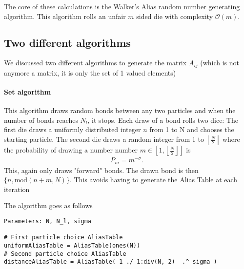 \documentclass[a4paper]{article}
\begin{document}
The core of these calculations is the Walker's Alias random number generating algorithm. This algorithm rolls an unfair $m$ sided die with complexity $\mathcal{O}(m)$.

\subsection{Two different algorithms}

We discussed two different algorithms to generate the matrix $A_{ij}$ (which is not anymore a matrix, it is only the set of 1 valued elements)

\paragraph{Set algorithm}
This algorithm draws random bonds between any two particles and when the number of bonds reaches $N_l$, it stops.
Each draw of a bond rolls two dice: The first die draws a uniformly distributed integer $n$ from 1 to N and chooses the starting particle. The second die draws a random integer from 1 to $\left\lfloor \frac{N}{2} \right\rfloor$ where the probability of drawing a number number $m \in [1, \left\lfloor \frac{N}{2} \right\rfloor]$ is 
\begin{align}
	P_m = m^{-\sigma}.
\end{align}
This, again only draws "forward" bonds.
The drawn bond is then $\{n, \text{mod}\left(n+m,  N  \right) \}$. This avoids having to generate the Alias Table at each iteration

The algorithm goes as follows
\begin{lstlisting}
Parameters: N, N_l, sigma

# First particle choice AliasTable
uniformAliasTable = AliasTable(ones(N))	
# Second particle choice AliasTable
distanceAliasTable = AliasTable( 1 ./ 1:div(N, 2)  .^ sigma )
\end{lstlisting}
\end{document}
